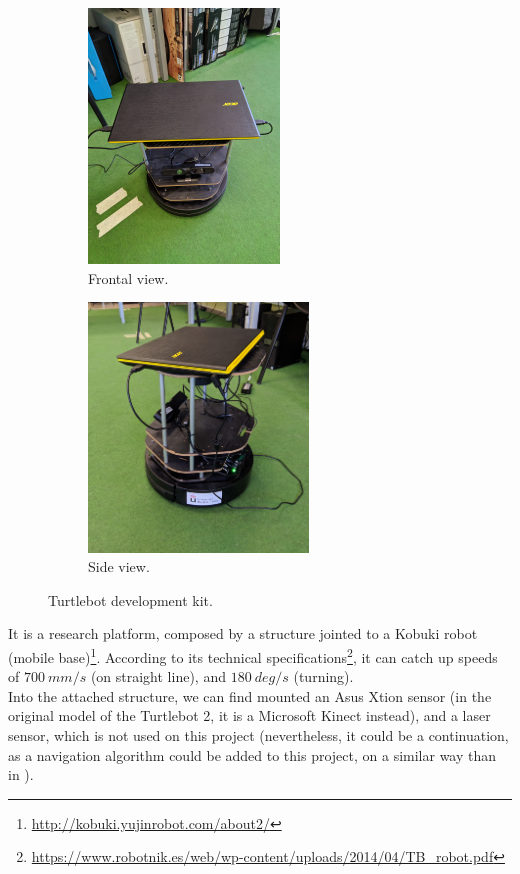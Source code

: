 		\begin{figure}[h]
			\centering
			\begin{subfigure}[h]{0.4\linewidth}
				\includegraphics[width=2in]{images/real_turtlebot_1}
				\caption{Frontal view.}
				\label{fig:3_turtlebot_front}
			\end{subfigure}
			\begin{subfigure}[h]{0.4\linewidth}
				\includegraphics[width=2.3in]{images/real_turtlebot_2}
				\caption{Side view.}
				\label{fig:3_turtlebot_side}
			\end{subfigure}
			\caption{Turtlebot development kit.}
			\label{fig:3_turtlebot}
		\end{figure}
		
		It is a research platform, composed by a structure jointed to a Kobuki robot (mobile base)\footnote{\url{http://kobuki.yujinrobot.com/about2/}}. According to its technical specifications\footnote{\url{https://www.robotnik.es/web/wp-content/uploads/2014/04/TB_robot.pdf}}, it can catch up speeds of $700 \ mm/s$ (on straight line), and $180\ deg/s$ (turning).\\
		
		Into the attached structure, we can find mounted an Asus Xtion sensor (in the original model of the Turtlebot 2, it is a Microsoft Kinect instead), and a laser sensor, which is not used on this project (nevertheless, it could be a continuation, as a navigation algorithm could be added to this project, on a similar way than in \cite{rocapal}).\\
	

